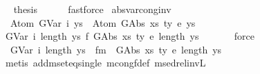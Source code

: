 \begin{isabellebody}
\ \isamarkupfalse%
\ {\isacharquery}{\kern0pt}thesis\isanewline
\ \ \ \ \isamarkupfalse%
\ fastforce\isanewline
{}\isamarkupfalse%
%
\endisatagproof
{\isafoldproof}%
%
\isadelimproof
\isanewline
%
\endisadelimproof
\isanewline
\isanewline
{}\isamarkupfalse%
\ abs{\isacharunderscore}{\kern0pt}var{\isacharunderscore}{\kern0pt}cong{\isacharunderscore}{\kern0pt}inv{\isacharcolon}{\kern0pt}\isanewline
\ \ {\isachardoublequoteopen}{\isasymnot}{\isacharparenleft}{\kern0pt}Atom\ {\isacharparenleft}{\kern0pt}GVar\ i{\isacharparenright}{\kern0pt}\ ys{\isacharprime}{\kern0pt}\ {\isasymsimeq}\ Atom\ {\isacharparenleft}{\kern0pt}GAbs\ xs\ ty{}\ e{\isacharparenright}{\kern0pt}\ ys{\isacharparenright}{\kern0pt}{\isachardoublequoteclose}\isanewline
%
\isadelimproof
%
\endisadelimproof
%
\isatagproof
{}\isamarkupfalse%
\ {\isacharminus}{\kern0pt}\isanewline
\ \ \isamarkupfalse%
\ {\isachardoublequoteopen}{\isasymnot}{\isacharparenleft}{\kern0pt}{\isacharparenleft}{\kern0pt}GVar\ i{\isacharcomma}{\kern0pt}\ length\ ys{\isacharprime}{\kern0pt}{\isacharparenright}{\kern0pt}\ {\isasymsimeq}f\ {\isacharparenleft}{\kern0pt}GAbs\ xs\ ty{}\ e{\isacharcomma}{\kern0pt}\ length\ ys{\isacharparenright}{\kern0pt}{\isacharparenright}{\kern0pt}{\isachardoublequoteclose}\isanewline
\ \ \ \ \ \isamarkupfalse%
\ force\isanewline
\ \ \isamarkupfalse%
\ \isamarkupfalse%
\ {\isachardoublequoteopen}{\isasymnot}{\isacharparenleft}{\kern0pt}{\isacharbraceleft}{\kern0pt}{\isacharhash}{\kern0pt}\ {\isacharparenleft}{\kern0pt}GVar\ i{\isacharcomma}{\kern0pt}\ length\ ys{\isacharprime}{\kern0pt}{\isacharparenright}{\kern0pt}\ {\isacharhash}{\kern0pt}{\isacharbraceright}{\kern0pt}\ {\isasymsimeq}fm\ {\isacharbraceleft}{\kern0pt}{\isacharhash}{\kern0pt}\ {\isacharparenleft}{\kern0pt}GAbs\ xs\ ty{}\ e{\isacharcomma}{\kern0pt}\ length\ ys{\isacharparenright}{\kern0pt}\ {\isacharhash}{\kern0pt}{\isacharbraceright}{\kern0pt}{\isacharparenright}{\kern0pt}{\isachardoublequoteclose}\isanewline
\ \ \ \ \ \isamarkupfalse%
\ {\isacharparenleft}{\kern0pt}metis\ add{\isacharunderscore}{\kern0pt}mset{\isacharunderscore}{\kern0pt}eq{\isacharunderscore}{\kern0pt}single\ mcong{\isacharunderscore}{\kern0pt}f{\isacharunderscore}{\kern0pt}def\ msed{\isacharunderscore}{\kern0pt}rel{\isacharunderscore}{\kern0pt}invL{\isacharparenright}{\kern0pt}\isanewline
\ \ \isamarkupfalse%
\ \isamarkupfalse%

\end{isabellebody}
